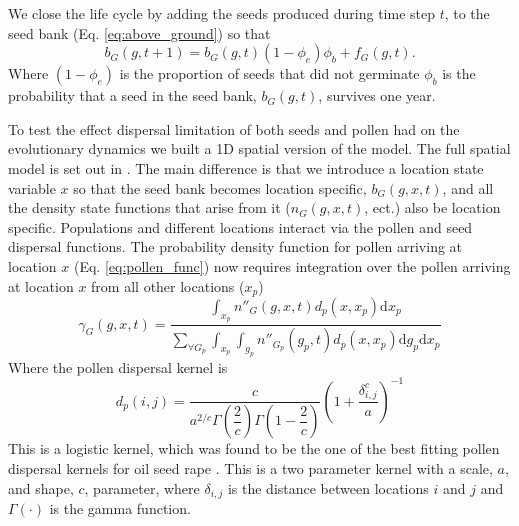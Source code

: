 \documentclass[10pt,letterpaper]{article}
\begin{document}
We close the life cycle by adding the seeds produced during time step $t$, to the seed bank (Eq. \ref{eq:above_ground}) so that 
\begin{equation}
	b_G(g, t + 1) = b_G(g, t)(1 - \phi_e)\phi_b + f_G(g, t).  
\end{equation}
Where $(1 - \phi_e)$ is the proportion of seeds that did not germinate $\phi_b$ is the probability that a seed in the seed bank, $b_G(g, t)$, survives one year. 

To test the effect dispersal limitation of both seeds and pollen had on the evolutionary dynamics we built a 1D spatial version of the model. The full spatial model is set out in . The main difference is that we introduce a location state variable $x$ so that the seed bank becomes location specific, $b_G(g, x, t)$, and all the density state functions that arise from it ($n_G(g, x, t)$, ect.) also be location specific. Populations and different locations interact via the pollen and seed dispersal functions. The probability density function for pollen arriving at location $x$ (Eq. \ref{eq:pollen_func}) now requires integration over the pollen arriving at location $x$ from all other locations ($x_p$)  
\begin{equation}\label{eq:pollen_func_space}
\gamma_G(g, x, t) = \frac{\int_{x_p} n''_G(g, x, t)d_p(x, x_p)\text{d}x_p} {\sum_{\forall G_p}\int_{x_p}\int_{g_p} n''_{G_p}(g_p, t)d_p(x, x_p) \text{d}g_p\text{d}x_p} 
\end{equation}     
Where the pollen dispersal kernel is 
\begin{equation}\label{eq:pollen_disp}
	d_p(i, j) = \frac{c}{a^{2/c}\Gamma\left(\dfrac{2}{c} \right)\Gamma\left(1 - \dfrac{2}{c} \right)}\left( 1 + \dfrac{\delta_{i,j}^c}{a} \right)^{-1} 
\end{equation} 
This is a logistic kernel, which was found to be the one of the best fitting pollen dispersal kernels for oil seed rape \cite{Klei2006}. This is a two parameter kernel with a scale, $a$, and shape, $c$, parameter, where $\delta_{i,j}$ is the distance between locations $i$ and $j$ and $\Gamma(\cdot)$ is the gamma function. 
\end{document}
